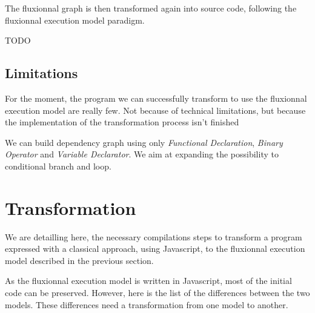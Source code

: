 



The fluxionnal graph is then transformed again into source code, following the fluxionnal execution model paradigm.


\begin{code}[Javascript, caption={Fluxionnal code},label={lst:flxcode}]
TODO
\end{code}


\subsection{Limitations}

For the moment, the program we can successfully transform to use the fluxionnal execution model are really few.
Not because of technical limitations, but because the implementation of the transformation process isn't finished

We can build dependency graph using only \textit{Functional Declaration}, \textit{Binary Operator} and \textit{Variable Declarator}.
We aim at expanding the possibility to conditional branch and loop.




\section{Transformation}

	We are detailling here, the necessary compilations steps to transform a program expressed with a classical approach, using Javascript, to the fluxionnal execution model described in the previous section.

	As the fluxionnal execution model is written in Javascript, most of the initial code can be preserved.
	However, here is the list of the differences between the two models.
	These differences need a transformation from one model to another.

